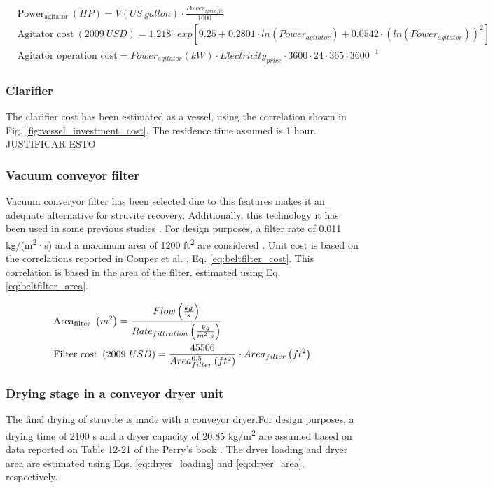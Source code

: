\documentclass[10pt,a4paper]{article}
\begin{document}
\begin{align} 
& \text{Power}_{\text{agitator}} \ \left(HP\right) =  V\left(US \ gallon\right) \cdot\frac{Power_{specefic}}{1000} \label{eq:agitator_power} \\
& \text{Agitator cost} \ \left(2009 \ USD\right) = 1.218 \cdot exp[9.25 + 0.2801  \cdot ln(Power_{agitator})+0.0542 \cdot (ln(Power_{agitator}))^2] \label{eq:agitator_cost}\\
& \text{Agitator operation cost}  = Power_{agitator}\left(kW\right) \cdot Electricity_{price} \cdot 3600 \cdot 24 \cdot 365 \cdot 3600^{-1} \label{eq:agitator_op_cost}
\end{align}

\subsubsection{Clarifier}
The clarifier cost has been estimated as a vessel, using the correlation shown in Fig. \ref{fig:vessel_investment_cost}. The residence time assumed is 1 hour. JUSTIFICAR ESTO

\subsubsection{Vacuum conveyor filter}
Vacuum converyor filter has been selected due to this features makes it an adequate alternative for struvite recovery. Additionally, this technology it has been used in some previous studies \cite{Matynia}. For design purposes, a filter rate of 0.011 kg/(m\textsuperscript{2}·s) and a maximum area of 1200 ft\textsuperscript{2} are considered \cite{Walas}. Unit cost is based on the correlations reported in Couper et al. \cite{Walas}, Eq. \ref{eq:beltfilter_cost}. This correlation is based in the area of the filter, estimated using Eq. \ref{eq:beltfilter_area}.

\begin{align} 
& \text{\text{Area}}_{\text{filter}} \ \left(m^{2}\right) = \frac{Flow \left( \frac{kg}{s} \right)}{Rate_{filtration} \left( \frac{kg}{m^{2} \cdot s} \right)} \label{eq:beltfilter_area} \\
& \text{Filter cost} \ \left(2009 \ USD\right) = \frac{45506}{Area_{filter}^{0.5} \left( ft^{2} \right)} \cdot Area_{filter} \left( ft^{2} \right) \label{eq:beltfilter_cost}
\end{align}


\subsubsection{Drying stage in a conveyor dryer unit}
The final drying of struvite is made with a conveyor dryer.For design purposes, a drying time of 2100 s and a dryer capacity of 20.85 kg/m\textsuperscript{2} are assumed based on data reported on Table 12-21 of the Perry's book \cite{Perry}. The dryer loading and dryer area are estimated using Eqs. \ref{eq:dryer_loading} and \ref{eq:dryer_area}, respectively.
\end{document}
